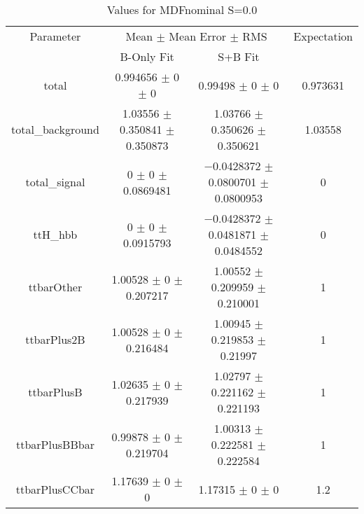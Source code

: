 \begin{table}
\centering
\caption{Values for MDFnominal S=0.0}
\begin{tabular}{cccc}
\toprule
Parameter & \multicolumn{2}{c}{Mean $\pm$ Mean Error $\pm$ RMS} & Expectation\\
 & B-Only Fit & S+B Fit & \\
\midrule
total & \num{0.994656} $\pm$ \num{0} $\pm$ \num{0} & \num{0.99498} $\pm$ \num{0} $\pm$ \num{0} & \num{0.973631}\\
total\_background & \num{1.03556} $\pm$ \num{0.350841} $\pm$ \num{0.350873} & \num{1.03766} $\pm$ \num{0.350626} $\pm$ \num{0.350621} & \num{1.03558}\\
total\_signal & \num{0} $\pm$ \num{0} $\pm$ \num{0.0869481} & \num{-0.0428372} $\pm$ \num{0.0800701} $\pm$ \num{0.0800953} & \num{0}\\
ttH\_hbb & \num{0} $\pm$ \num{0} $\pm$ \num{0.0915793} & \num{-0.0428372} $\pm$ \num{0.0481871} $\pm$ \num{0.0484552} & \num{0}\\
ttbarOther & \num{1.00528} $\pm$ \num{0} $\pm$ \num{0.207217} & \num{1.00552} $\pm$ \num{0.209959} $\pm$ \num{0.210001} & \num{1}\\
ttbarPlus2B & \num{1.00528} $\pm$ \num{0} $\pm$ \num{0.216484} & \num{1.00945} $\pm$ \num{0.219853} $\pm$ \num{0.21997} & \num{1}\\
ttbarPlusB & \num{1.02635} $\pm$ \num{0} $\pm$ \num{0.217939} & \num{1.02797} $\pm$ \num{0.221162} $\pm$ \num{0.221193} & \num{1}\\
ttbarPlusBBbar & \num{0.99878} $\pm$ \num{0} $\pm$ \num{0.219704} & \num{1.00313} $\pm$ \num{0.222581} $\pm$ \num{0.222584} & \num{1}\\
ttbarPlusCCbar & \num{1.17639} $\pm$ \num{0} $\pm$ \num{0} & \num{1.17315} $\pm$ \num{0} $\pm$ \num{0} & \num{1.2}\\
\bottomrule
\end{tabular}
\end{table}